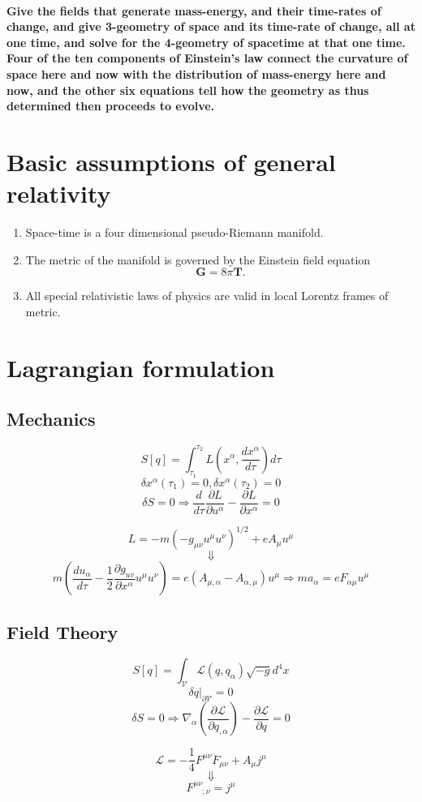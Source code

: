 \paragraph*{Give the fields that generate mass-energy, and their time-rates of change, and give 3-geometry of space and its time-rate of change, all at one time, and solve for the 4-geometry of spacetime at that one time. Four of the ten components of Einstein's law connect the curvature of space here and now with the distribution of mass-energy here and now, and the other six equations tell how the geometry as thus determined then proceeds to evolve.}

\section{Basic assumptions of general relativity}
\begin{enumerate}
\item Space-time is a four dimensional pseudo-Riemann manifold.
\item The metric of the manifold is governed by the Einstein field equation
\[\bm{G} = 8\pi\bm{T}.\]
\item  All special relativistic laws of physics are valid in local Lorentz frames of metric.
\end{enumerate}

\section{Lagrangian formulation}
\subsection{Mechanics}
\[S[q] = \int_{\tau_1}^{\tau_2} L(x^{\alpha},\frac{dx^{\alpha}}{d\tau}) d\tau\]
\[\delta x^{\alpha}(\tau_1)=0, \delta x^{\alpha}(\tau_2)=0\]
\[\delta S = 0 \Rightarrow \frac{d}{d\tau} \frac{\partial L}{\partial u^{\alpha}} - \frac{\partial L}{\partial x^{\alpha}}=0\]
\begin{example}
\[L = -m(-g_{\mu\nu} u^{\mu} u^{\nu})^{1/2} + e A_{\mu} u^{\mu}\]
\[\Downarrow\]
\[m(\frac{du_{\alpha}}{d\tau} - \frac{1}{2} \frac{\partial g_{uv}}{\partial x^{\alpha}} u^{\mu} u^{\nu}) = e(A_{\mu,\alpha}-A_{\alpha,\mu})u^{\mu} \Rightarrow ma_{\alpha} = eF_{\alpha\mu} u^{\mu} \]
\end{example}

\subsection{Field Theory}
\[S[q] = \int_{\mathcal{V}} \mathcal{L}(q,q_{\alpha})\sqrt{-g} d^4x\]
\[\delta q|_{\partial \mathcal{V}} = 0\]
\[\delta S = 0 \Rightarrow \nabla_{\alpha} (\frac{\partial \mathcal{L}}{\partial q_{,\alpha}}) - \frac{\partial \mathcal{L}}{\partial q} = 0\]
\begin{example}
\[\mathcal{L} = -\frac{1}{4} F^{\mu \nu} F_{\mu \nu} + A_{\mu} j^{\mu}\]
\[\Downarrow\]
\[F^{\mu \nu}_{\phantom{\mu \nu} ;\nu} = j^{\mu}\]
\end{example}

